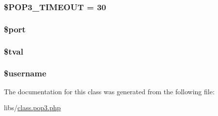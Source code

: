 \subsubsection[{\$\+P\+O\+P3\+\_\+\+T\+I\+M\+E\+O\+U\+T}]{\setlength{\rightskip}{0pt plus 5cm}\$P\+O\+P3\+\_\+\+T\+I\+M\+E\+O\+U\+T = 30}\label{class_p_o_p3_a5a68cb992276c956e16214f08e62ce3a}
\hypertarget{class_p_o_p3_aa0787efab4b22e8a212882f3409d4c77}{}
\subsubsection[{\$port}]{\setlength{\rightskip}{0pt plus 5cm}\$port}\label{class_p_o_p3_aa0787efab4b22e8a212882f3409d4c77}
\hypertarget{class_p_o_p3_a19650abd43de047c5f64c5a1a84e4533}{}
\subsubsection[{\$tval}]{\setlength{\rightskip}{0pt plus 5cm}\$tval}\label{class_p_o_p3_a19650abd43de047c5f64c5a1a84e4533}
\hypertarget{class_p_o_p3_a0eb82aa5f81cf845de4b36cd653c42cf}{}
\subsubsection[{\$username}]{\setlength{\rightskip}{0pt plus 5cm}\$username}\label{class_p_o_p3_a0eb82aa5f81cf845de4b36cd653c42cf}


The documentation for this class was generated from the following file\+:\begin{DoxyCompactItemize}
\item 
libs/\hyperlink{class_8pop3_8php}{class.\+pop3.\+php}\end{DoxyCompactItemize}
